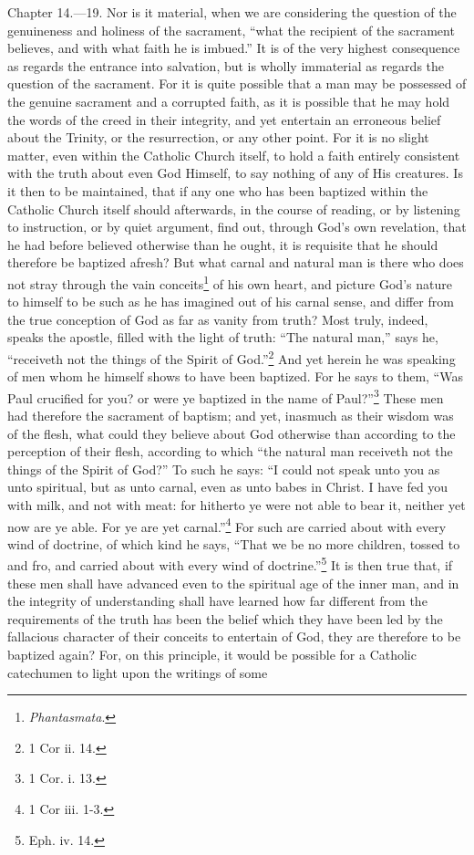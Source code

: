 Chapter 14.—19. Nor is it material, when we are considering the question of the genuineness and holiness of the sacrament, ``what the recipient of the sacrament believes, and with what faith he is imbued.'' It is of the very highest consequence as regards the entrance into salvation, but is wholly immaterial as regards the question of the sacrament. For it is quite possible that a man may be possessed of the genuine sacrament and a corrupted faith, as it is possible that he may hold the words of the creed in their integrity, and yet entertain an erroneous belief about the Trinity, or the resurrection, or any other point. For it is no slight matter, even within the Catholic Church itself, to hold a faith entirely consistent with the truth about even God Himself, to say nothing of any of His creatures. Is it then to be maintained, that if any one who has been baptized within the Catholic Church itself should afterwards, in the course of reading, or by listening to instruction, or by quiet argument, find out, through God’s own revelation, that he had before believed otherwise than he ought, it is requisite that he should therefore be baptized afresh? But what carnal and natural man is there who does not stray through the vain conceits\footnote{\par  \emph{Phantasmata}.} of his own heart, and picture God’s nature to himself to be such as he has imagined out of his carnal sense, and differ from the true conception of God as far as vanity from truth? Most truly, indeed, speaks the apostle, filled with the light of truth: ``The natural man,'' says he, ``receiveth not the things of the Spirit of God.''\footnote{\par  1 Cor ii. 14.} And yet herein he was speaking of men whom he himself shows to have been baptized. For he says to them, ``Was Paul crucified for you? or were ye baptized in the name of Paul?''\footnote{\par  1 Cor. i. 13.} These men had therefore the sacrament of baptism; and yet, inasmuch as their wisdom was of the flesh, what could they believe about God otherwise than according to the perception of their flesh, according to which ``the natural man receiveth not the things of the Spirit of God?'' To such he says: ``I could not speak unto you as unto spiritual, but as unto carnal, even as unto babes in Christ. I have fed you with milk, and not with meat: for hitherto ye were not able to bear it, neither yet now are ye able. For ye are yet carnal.''\footnote{\par  1 Cor iii. 1-3.} For such are carried about with every wind of doctrine, of which kind he says, ``That we be no more children, tossed to and fro, and carried about with every wind of doctrine.''\footnote{\par  Eph. iv. 14.} It is then true that, if these men shall have advanced even to the spiritual age of the inner man, and in the integrity of understanding shall have learned how far different from the requirements of the truth has been the belief which they have been led by the fallacious character of their conceits to entertain of God, they are therefore to be baptized again? For, on this principle, it would be possible for a Catholic catechumen to light upon the writings of some 